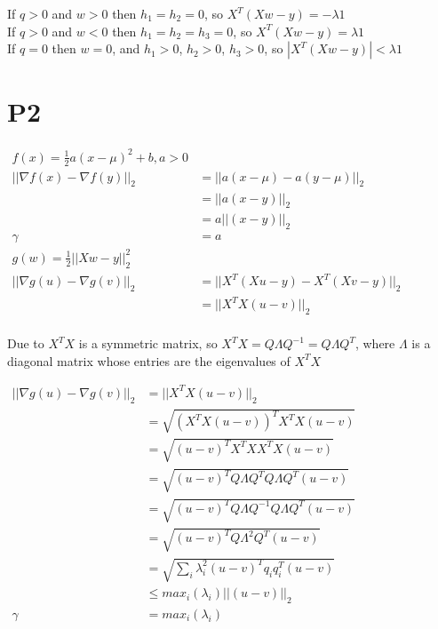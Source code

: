 \documentclass{article}
\begin{document}
If $q > 0$ and $w > 0$ then $h_1 = h_2 = 0$, so $X^T(Xw-y) = - \lambda1$ \\
If $q > 0$ and $w < 0$ then $h_1 = h_2 = h_3 = 0$, so $X^T(Xw-y) = \lambda1$ \\
If $q = 0$ then $w = 0$, and $h_1 > 0$, $h_2 > 0$, $h_3 > 0$, so $|X^T(Xw-y)| < \lambda1$ \\

\section{P2}

\begin{center}
  $
  \begin{aligned}
    f(x) = \frac{1}{2} a (x-\mu)^2+b, a>0 & \\
    ||\nabla f(x) - \nabla f(y)||_2 &= ||a(x-\mu) - a(y-\mu)||_2 \\
                                    &= ||a(x-y)||_2 \\
                                    &= a||(x-y)||_2 \\
                             \gamma &= a \\
    g(w) = \frac{1}{2} ||Xw-y||_2^2 & \\
    ||\nabla g(u) - \nabla g(v)||_2 &= ||X^T(Xu-y) - X^T(Xv-y)||_2 \\
                                    &= ||X^TX(u-v)||_2 \\
  \end{aligned}
  $
\end{center}

Due to $X^TX$ is a symmetric matrix, so $X^TX = Q \Lambda Q^{-1} = Q \Lambda Q^T$, where $\Lambda$ is a diagonal matrix whose entries are the eigenvalues of $X^TX$

\begin{center}
  $
  \begin{aligned}
    ||\nabla g(u) - \nabla g(v)||_2 &= ||X^TX(u-v)||_2 \\
                                    &= \sqrt{(X^TX(u-v))^T X^TX(u-v)} \\
                                    &= \sqrt{(u-v)^TX^TXX^TX(u-v)} \\
                                    &= \sqrt{(u-v)^T Q \Lambda Q^T Q \Lambda Q^T (u-v)} \\
                                    &= \sqrt{(u-v)^T Q \Lambda Q^{-1} Q \Lambda Q^T (u-v)} \\
                                    &= \sqrt{(u-v)^T Q \Lambda^2 Q^T (u-v)} \\
                                    &= \sqrt{\sum_i \lambda_i^2 (u-v)^T q_i q_i^T (u-v)} \\
                                    &\le max_i(\lambda_i) ||(u-v)||_2 \\
                             \gamma &= max_i(\lambda_i)
  \end{aligned}
  $
\end{center}
\end{document}
